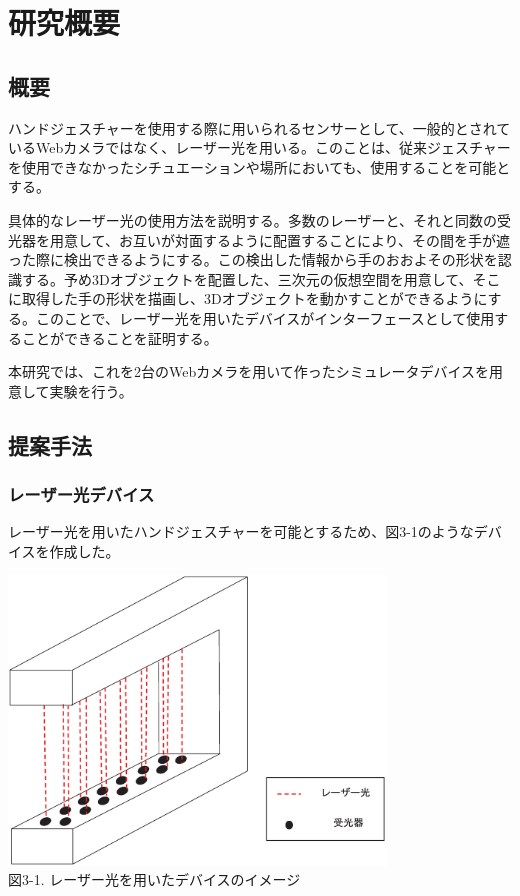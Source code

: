 \section{研究概要}



\subsection{概要}
ハンドジェスチャーを使用する際に用いられるセンサーとして、一般的とされているWebカメラではなく、レーザー光を用いる。このことは、従来ジェスチャーを使用できなかったシチュエーションや場所においても、使用することを可能とする。

具体的なレーザー光の使用方法を説明する。多数のレーザーと、それと同数の受光器を用意して、お互いが対面するように配置することにより、その間を手が遮った際に検出できるようにする。この検出した情報から手のおおよその形状を認識する。予め3Dオブジェクトを配置した、三次元の仮想空間を用意して、そこに取得した手の形状を描画し、3Dオブジェクトを動かすことができるようにする。このことで、レーザー光を用いたデバイスがインターフェースとして使用することができることを証明する。

本研究では、これを2台のWebカメラを用いて作ったシミュレータデバイスを用意して実験を行う。



\subsection{提案手法}
\subsubsection{レーザー光デバイス}
レーザー光を用いたハンドジェスチャーを可能とするため、図3-1のようなデバイスを作成した。

\begin{center}
  \includegraphics[width=10cm]{RazerDevice_image} \\

 \vspace{1mm}
  図3-1. レーザー光を用いたデバイスのイメージ
\end{center}

